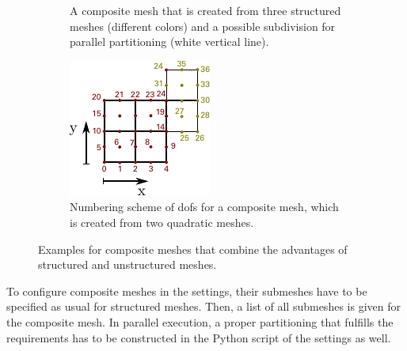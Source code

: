 \begin{figure}%
  \centering%
  \begin{subfigure}[t]{0.45\textwidth}%
    \centering%
    \def\svgwidth{0.7\textwidth}%
    
    \caption{A composite mesh that is created from three structured meshes (different colors) and a possible subdivision for parallel partitioning (white vertical line).}%
    \label{fig:meshes_composite}%
  \end{subfigure}
  \quad
  \begin{subfigure}[t]{0.45\textwidth}%
    \centering%
    \includegraphics[width=\textwidth]{images/implementation/dof_numbering_structured_composite.pdf}
    \caption{Numbering scheme of dofs for a composite mesh, which is created from two quadratic meshes.}%
    \label{fig:dof_numbering_structured_composite}%
  \end{subfigure}
  \caption{Examples for composite meshes that combine the advantages of structured and unstructured meshes.}%
  \label{fig:composite_meshes}%
\end{figure}%

To configure composite meshes in the settings, their submeshes have to be specified as usual for structured meshes. Then, a list of all submeshes is given for the composite mesh. In parallel execution, a proper partitioning that fulfills the requirements has to be constructed in the Python script of the settings as well.

